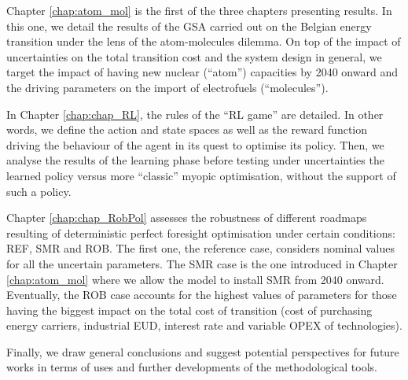 Chapter \ref{chap:atom_mol} is the first of the three chapters presenting results. In this one, we detail the results of the \gls{GSA} carried out on the Belgian energy transition under the lens of the atom-molecules dilemma. On top of the impact of uncertainties on the total transition cost and the system design in general, we target the impact of having new nuclear (``atom'') capacities by 2040 onward and the driving parameters on the import of electrofuels (``molecules'').

In Chapter \ref{chap:chap_RL}, the rules of the ``\gls{RL} game'' are detailed. In other words, we define the action and state spaces as well as the reward function driving the behaviour of the agent in its quest to optimise its policy. Then, we analyse the results of the learning phase before testing under uncertainties the learned policy versus more ``classic'' myopic optimisation, \ie without the support of such a policy.

Chapter \ref{chap:chap_RobPol} assesses the robustness of different roadmaps resulting of deterministic perfect foresight optimisation under certain conditions: REF, SMR and ROB. The first one, the reference case, considers nominal values for all the uncertain parameters. The SMR case is the one introduced in Chapter \ref{chap:atom_mol} where we allow the model to install \gls{SMR} from 2040 onward. Eventually, the ROB case accounts for the highest values of parameters for those having the biggest impact on the total cost of transition (\ie cost of purchasing energy carriers, industrial \gls{EUD}, interest rate and variable \gls{OPEX} of technologies).

Finally, we draw general conclusions and suggest potential perspectives for future works in terms of uses and further developments of the methodological tools.